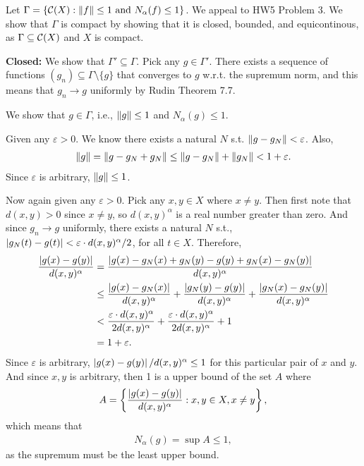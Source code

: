 \documentclass[12pt]{article}
\begin{document}
\begin{fproof}[1(a)]
    Let \(\Gamma = \left\{ \mathcal{C}(X):\left\lVert f \right\rVert\leq 1 \text{ and } N_{\alpha}(f) \leq 1 \right\}\).
    We appeal to HW5 Problem 3.
    We show that \(\Gamma\) is compact by showing that it is closed, bounded, and equicontinous, as \(\Gamma \subseteq \mathcal{C}(X)\) and \(X\) is compact.

    \textbf{Closed:}
    We show that \(\Gamma' \subseteq \Gamma\).
    Pick any \(g \in \Gamma'\).
    There exists a sequence of functions \((g_n) \subseteq \Gamma \setminus \{g\}\) that converges to \(g\) w.r.t. the supremum norm, and this means that \(g_n \to g\) uniformly by Rudin Theorem 7.7.

    We show that \(g \in \Gamma\), i.e., \(\left\lVert g \right\rVert \leq 1\) and \(N_{\alpha}(g) \leq 1\).

    Given any \(\varepsilon > 0\).
    We know there exists a natural \(N\) s.t. \(\left\lVert g - g_N \right\rVert < \varepsilon\).
    Also,
    \begin{align*}
        \left\lVert g \right\rVert = \left\lVert g - g_N + g_N \right\rVert \leq \left\lVert g-g_N \right\rVert + \left\lVert g_N \right\rVert < 1 + \varepsilon.
    \end{align*}
    Since \(\varepsilon\) is arbitrary, \(\left\lVert g \right\rVert \leq 1\).

    Now again given any \(\varepsilon > 0\).
    Pick any \(x,y \in X\) where \(x \neq y\).
    Then first note that \(d(x,y)>0\) since \(x\neq y\), so \(d(x,y)^{\alpha}\) is a real number greater than zero.
    And since \(g_n \to g\) uniformly, there exists a natural \(N\) s.t., \(\left\lvert g_N(t)-g(t) \right\rvert < \varepsilon \cdot d(x,y)^{\alpha}/2\), for all \(t \in X\).
    Therefore,
    \begin{align*}
        \frac{\left\lvert g(x)-g(y) \right\rvert}{d(x,y)^{\alpha}} &= \frac{\left\lvert g(x)-g_N(x) + g_N(y) -g(y) + g_N(x)-g_N(y) \right\rvert}{d(x,y)^{\alpha}}\\
        & \leq \frac{\left\lvert g(x)-g_N(x) \right\rvert}{d(x,y)^{\alpha}} + \frac{\left\lvert g_N(y)-g(y) \right\rvert}{d(x,y)^{\alpha}} + \frac{\left\lvert g_N(x)-g_N(y) \right\rvert}{d(x,y)^{\alpha}}\\
        &<\frac{\varepsilon \cdot d(x,y)^{\alpha}}{2 d(x,y)^{\alpha}} + \frac{\varepsilon \cdot d(x,y)^{\alpha}}{2 d(x,y)^{\alpha}} + 1\\
        &= 1 + \varepsilon.
    \end{align*}
    Since \(\varepsilon\) is arbitrary, \(\left\lvert g(x)-g(y) \right\rvert/d(x,y)^{\alpha} \leq 1\) for this particular pair of \(x\) and \(y\).
    And since \(x,y\) is arbitrary,
    then 1 is a upper bound of the set \(A\) where 
    \begin{align*}
        A = \left\{ \frac{\left\lvert g(x)-g(y) \right\rvert}{d(x,y)^{\alpha}} : x,y \in X, x\neq y \right\},
    \end{align*}
    which means that
    \begin{align*}
        N_{\alpha}(g) = \sup A \leq 1,
    \end{align*}
    as the supremum must be the least upper bound.


\end{fproof}
\end{document}
